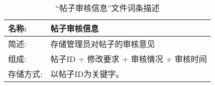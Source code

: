 \begin{table}[H]  
\caption{“帖子审核信息”文件词条描述}  
\begin{center}  
    \begin{tabular}{l p{10cm}} 
        \hline
        \quad 名称:  &  帖子审核信息 \\
        \hline
        \quad 简述:  & 存储管理员对帖子的审核意见 \\
        \hline
        \quad 组成:  & 帖子ID + 修改要求 + 审核情况 + 审核时间 \\
        \hline
        \quad 存储方式:  & 以帖子ID为关键字。 \\
        \hline
    \end{tabular}
    \label{tab1}
\end{center}
\end{table}